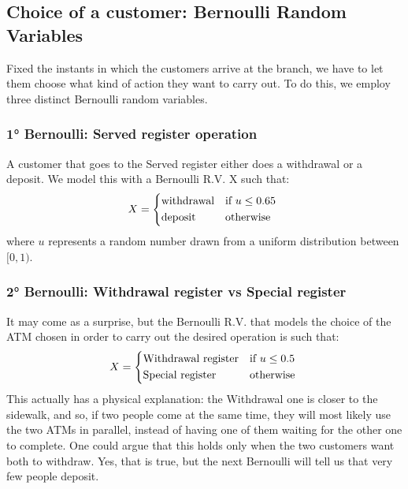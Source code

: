 \documentclass{article}
\begin{document}
\subsection{Choice of a customer: Bernoulli Random Variables}
Fixed the instants in which the customers arrive at the branch, we have to let them choose what kind of action they want to carry out. To do this, we employ three distinct Bernoulli random variables.
\subsubsection{1° Bernoulli: Served register operation}
A customer that goes to the Served register either does a withdrawal or a deposit. We model this with a Bernoulli R.V. X such that:
 \begin{equation*}
    X =
    \begin{cases*}
      \text{withdrawal} & if $u \leq 0.65$ \\
      \text{deposit}        & otherwise
    \end{cases*}
  \end{equation*}
where $u$ represents a random number drawn from a uniform distribution between $[0,1)$.
\subsubsection{2° Bernoulli: Withdrawal register vs Special register}
It may come as a surprise, but the Bernoulli R.V. that models the choice of the ATM chosen in order to carry out the desired operation is such that:
 \begin{equation*}
    X =
    \begin{cases*}
      \text{Withdrawal register} & if $u \leq 0.5$ \\
      \text{Special register}        & otherwise
    \end{cases*}
  \end{equation*}
This actually has a physical explanation: the Withdrawal one is closer to the sidewalk, and so, if two people come at the same time, they will most likely use the two ATMs in parallel, instead of having one of them waiting for the other one to complete. One could argue that this holds only when the two customers want both to withdraw. Yes, that is true, but the next Bernoulli will tell us that very few people deposit.
\end{document}

